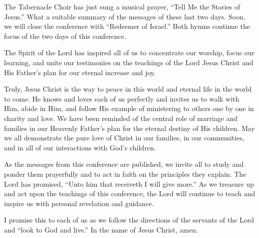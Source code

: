 \documentclass[letterpaper, 11pt]{report}
\begin{document}
The Tabernacle Choir has just sung a musical prayer, “Tell Me the Stories of Jesus.” What a suitable summary of the messages of these last two days. Soon, we will close the conference with “Redeemer of Israel.” Both hymns continue the focus of the two days of this conference.

The Spirit of the Lord has inspired all of us to concentrate our worship, focus our learning, and unite our testimonies on the teachings of the Lord Jesus Christ and His Father’s plan for our eternal increase and joy.

Truly, Jesus Christ is the way to peace in this world and eternal life in the world to come. He knows and loves each of us perfectly and invites us to walk with Him, abide in Him, and follow His example of ministering to others one by one in charity and love. We have been reminded of the central role of marriage and families in our Heavenly Father’s plan for the eternal destiny of His children. May we all demonstrate the pure love of Christ in our families, in our communities, and in all of our interactions with God’s children.

As the messages from this conference are published, we invite all to study and ponder them prayerfully and to act in faith on the principles they explain. The Lord has promised, “Unto him that receiveth I will give more.” As we treasure up and act upon the teachings of this conference, the Lord will continue to teach and inspire us with personal revelation and guidance.

I promise this to each of us as we follow the directions of the servants of the Lord and “look to God and live.” In the name of Jesus Christ, amen.
\end{document}
